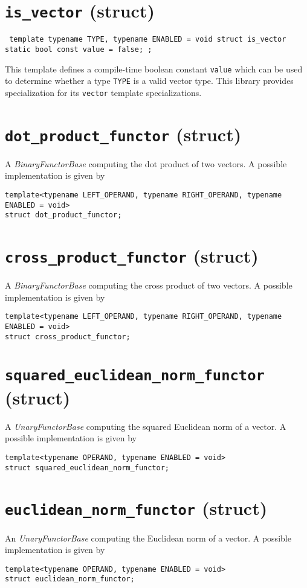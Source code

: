 \documentclass[oneside]{book}
\begin{document}
\section{\texttt{is\_vector} (struct)}
\texttt{
template \textlangle typename TYPE, typename ENABLED = void\textrangle\newline
struct is\_vector {\newline
  static bool const value = false;\newline
};}

\noindent{}This template defines a compile-time boolean constant \texttt{value}
which can be used to determine whether a type \texttt{TYPE} is a valid vector type.
This library provides specialization for its \texttt{vector} template specializations.

\section{\texttt{dot\_product\_functor} (struct)}
A \textit{BinaryFunctorBase} computing the dot product of two vectors.
A possible implementation is given by
\begin{verbatim}
template<typename LEFT_OPERAND, typename RIGHT_OPERAND, typename ENABLED = void>
struct dot_product_functor;
\end{verbatim}

\section{\texttt{cross\_product\_functor} (struct)}
A \textit{BinaryFunctorBase} computing the cross product of two vectors.
A possible implementation is given by
\begin{verbatim}
template<typename LEFT_OPERAND, typename RIGHT_OPERAND, typename ENABLED = void>
struct cross_product_functor;
\end{verbatim}

\section{\texttt{squared\_euclidean\_norm\_functor} (struct)}
A \textit{UnaryFunctorBase} computing the squared Euclidean norm of a vector.
A possible implementation is given by
\begin{verbatim}
template<typename OPERAND, typename ENABLED = void>
struct squared_euclidean_norm_functor;
\end{verbatim}

\section{\texttt{euclidean\_norm\_functor} (struct)}
An \textit{UnaryFunctorBase} computing the Euclidean norm of a vector.
A possible implementation is given by
\begin{verbatim}
template<typename OPERAND, typename ENABLED = void>
struct euclidean_norm_functor;
\end{verbatim}
\end{document}
